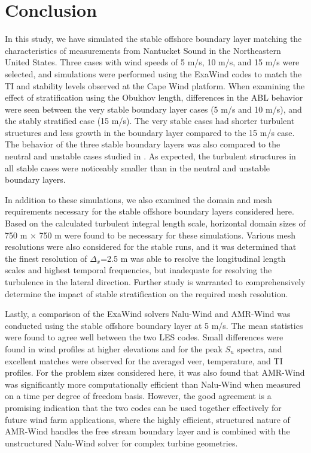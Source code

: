 \documentclass[conf]{new-aiaa}
\begin{document}
\section{Conclusion}
In this study, we have simulated the stable offshore boundary layer matching the
characteristics of measurements from Nantucket Sound in the Northeastern United
States. Three cases with wind speeds of 5 m/s, 10 m/s, and 15 m/s were
selected, and simulations were performed using the ExaWind codes to match the TI
and stability levels observed at the Cape Wind platform.  When examining
the effect of stratification using the Obukhov length, differences in the ABL
behavior were seen between the very stable boundary layer cases (5 m/s and 10
m/s), and the stably stratified case (15 m/s).  The very stable cases had
shorter turbulent structures and less growth in the boundary layer compared to
the 15 m/s case.  The behavior of the three stable boundary layers was also
compared to the neutral and unstable cases studied in \cite{cheung2020large}.
As expected, the turbulent structures in all stable cases were noticeably
smaller than in the neutral and unstable boundary layers.

In addition to these simulations, we also examined the domain and mesh
requirements necessary for the stable offshore boundary layers
considered here.  Based on the calculated turbulent integral
length scale, horizontal domain sizes of 750 m $\times$ 750 m were found
to be necessary for these simulations.  Various mesh resolutions were
also considered for the stable runs, and it was determined that the
finest resolution of $\Delta_x$=2.5 m was able to resolve the longitudinal
length scales and highest temporal frequencies, but inadequate for
resolving the turbulence in the lateral direction.  Further study is
warranted to comprehensively determine the impact of stable
stratification on the required mesh resolution.

Lastly, a comparison of the ExaWind solvers Nalu-Wind and AMR-Wind was
conducted using the stable offshore boundary layer at 5 m/s.  The mean
statistics were found to agree well between the two LES codes.  Small
differences were found in wind profiles at higher elevations and for
the peak $S_u$ spectra, and excellent matches were observed for the
averaged veer, temperature, and TI profiles.  For the problem sizes
considered here, it was also found that AMR-Wind was significantly
more computationally efficient than Nalu-Wind when measured on a time
per degree of freedom basis.  However, the good agreement is a
promising indication that the two codes can be used together
effectively for future wind farm applications, where the highly
efficient, structured nature of AMR-Wind handles the free stream
boundary layer and is combined with the unstructured Nalu-Wind solver
for complex turbine geometries.
\end{document}
